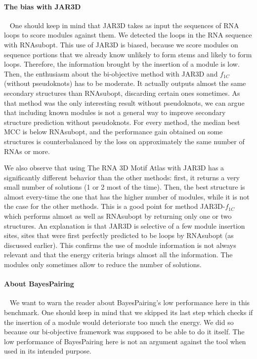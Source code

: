 \documentclass{bioinfo}
\begin{document}
\paragraph{The bias with JAR3D} ~ One should keep in mind that JAR3D takes as input the sequences of RNA loops to score modules against them. We detected the loops in the RNA sequence with RNAsubopt. This use of JAR3D is biased, because we score modules on sequence portions that we already know unlikely to form stems and likely to form loops. Therefore, the information brought by the insertion of a module is low. 
Then, the enthusiasm about the bi-objective method with JAR3D and $f_{1C}$ (without pseudoknots) has to be moderate. It actually outputs almost the same secondary structures than RNAsubopt, discarding certain ones sometimes. As that method was the only interesting result without pseudoknots, we can argue that including known modules is not a general way to improve secondary structure prediction without pseudoknots. For every method, the median best MCC is below RNAsubopt, and the performance gain obtained on some structures is counterbalanced by the loss on approximately the same number of RNAs or more.

We also observe that using The RNA 3D Motif Atlas with JAR3D has a significantly different behavior than the other methods: first, it returns a very small number of solutions (1 or 2 most of the time). Then, the best structure is almost every-time the one that has the higher number of modules, while it is not the case for the other methods. This is a good point for method JAR3D-$f_{1C}$ which performs almost as well as RNAsubopt by returning only one or two structures. An explanation is that JAR3D is selective of a few module insertion sites, sites that were first perfectly predicted to be loops by RNAsubopt (as discussed earlier). This confirms the use of module information is not always relevant and that the energy criteria brings almost all the information. The modules only sometimes allow to reduce the number of solutions.

\paragraph{About BayesPairing} ~ We want to warn the reader about BayesPairing's low performance here in this benchmark. One should keep in mind that we skipped its last step which checks if the insertion of a module would deteriorate too much the energy. We did so because our bi-objective framework was supposed to be able to do it itself. The low performance of BayesPairing here is not an argument against the tool when used in its intended purpose.
\end{document}
